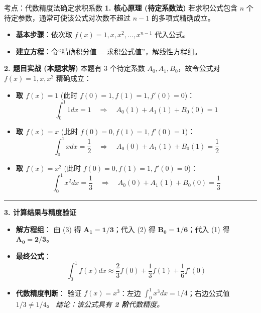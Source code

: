 \documentclass[12pt, a4paper]{article}
\begin{document}
\begin{knowpoint}{考点：代数精度法确定求积系数}
    \textbf{1. 核心原理 (待定系数法)}
    若求积公式包含 $n$ 个待定参数，通常可使该公式对次数不超过 $n-1$ 的多项式精确成立。
    \begin{itemize}
        \item \textbf{基本步骤}：依次取 $f(x) = 1, x, x^2, \dots, x^{n-1}$ 代入公式。
        \item \textbf{建立方程}：令“精确积分值 = 求积公式值”，解线性方程组。
    \end{itemize}

    \textbf{2. 题目实战 (本题求解)}
    本题有 3 个待定系数 $A_0, A_1, B_0$，故令公式对 $f(x) = 1, x, x^2$ 精确成立：
    \begin{itemize}
        \item \textbf{取 $f(x)=1$} (此时 $f(0)=1, f(1)=1, f'(0)=0$)：
        \[ \int_0^1 1 dx = 1 \quad \Rightarrow \quad A_0(1) + A_1(1) + B_0(0) = 1 \]
        
        \item \textbf{取 $f(x)=x$} (此时 $f(0)=0, f(1)=1, f'(0)=1$)：
        \[ \int_0^1 x dx = \frac{1}{2} \quad \Rightarrow \quad A_0(0) + A_1(1) + B_0(1) = \frac{1}{2} \]
        
        \item \textbf{取 $f(x)=x^2$} (此时 $f(0)=0, f(1)=1, f'(0)=0$)：
        \[ \int_0^1 x^2 dx = \frac{1}{3} \quad \Rightarrow \quad A_0(0) + A_1(1) + B_0(0) = \frac{1}{3} \]
    \end{itemize}

    \vspace{0.5em}
    \hrule
    \vspace{0.5em}

    \textbf{3. 计算结果与精度验证}
    \begin{itemize}
        \item \textbf{解方程组}：
        由 (3) 得 $\mathbf{A_1 = 1/3}$；代入 (2) 得 $\mathbf{B_0 = 1/6}$；代入 (1) 得 $\mathbf{A_0 = 2/3}$。
        
        \item \textbf{最终公式}：
        \[ \int_{0}^{1} f(x)dx \approx \frac{2}{3}f(0) + \frac{1}{3}f(1) + \frac{1}{6}f'(0) \]
        
        \item \textbf{代数精度判断}：
        验证 $f(x)=x^3$：左边 $\int_0^1 x^3 dx = 1/4$；右边公式值 $1/3 \neq 1/4$。
        \textit{结论：该公式具有 \textbf{2 阶}代数精度。}
    \end{itemize}
\end{knowpoint}
\end{document}
